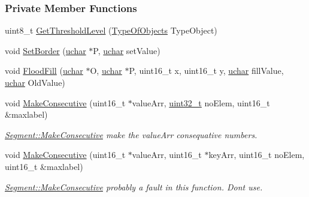 \subsubsection*{Private Member Functions}
\begin{DoxyCompactItemize}
\item 
uint8\+\_\+t \hyperlink{class_vision_1_1_segment_a1b15d616db9cbdcd0b07bb267f60895b}{Get\+Threshold\+Level} (\hyperlink{class_vision_1_1_segment_ac3ddf2c72ee6333007510b680db1e7dd}{Type\+Of\+Objects} Type\+Object)
\item 
void \hyperlink{class_vision_1_1_segment_ae3349aa3725f883943fb316c0d52752d}{Set\+Border} (\hyperlink{_soil_math_types_8h_a65f85814a8290f9797005d3b28e7e5fc}{uchar} $\ast$P, \hyperlink{_soil_math_types_8h_a65f85814a8290f9797005d3b28e7e5fc}{uchar} set\+Value)
\item 
void \hyperlink{class_vision_1_1_segment_a5d8f5daae7e5ca64c5e273464624f6bd}{Flood\+Fill} (\hyperlink{_soil_math_types_8h_a65f85814a8290f9797005d3b28e7e5fc}{uchar} $\ast$O, \hyperlink{_soil_math_types_8h_a65f85814a8290f9797005d3b28e7e5fc}{uchar} $\ast$P, uint16\+\_\+t x, uint16\+\_\+t y, \hyperlink{_soil_math_types_8h_a65f85814a8290f9797005d3b28e7e5fc}{uchar} fill\+Value, \hyperlink{_soil_math_types_8h_a65f85814a8290f9797005d3b28e7e5fc}{uchar} Old\+Value)
\item 
void \hyperlink{class_vision_1_1_segment_ad1d04c97a79dbbf1cf10e8587985e5e5}{Make\+Consecutive} (uint16\+\_\+t $\ast$value\+Arr, \hyperlink{_soil_math_types_8h_a435d1572bf3f880d55459d9805097f62}{uint32\+\_\+t} no\+Elem, uint16\+\_\+t \&maxlabel)
\begin{DoxyCompactList}\small\item\em \hyperlink{class_vision_1_1_segment_ad1d04c97a79dbbf1cf10e8587985e5e5}{Segment\+::\+Make\+Consecutive} make the value\+Arr consequative numbers. \end{DoxyCompactList}\item 
void \hyperlink{class_vision_1_1_segment_abbcd44154f3be5c7a0ee7fec67838f59}{Make\+Consecutive} (uint16\+\_\+t $\ast$value\+Arr, uint16\+\_\+t $\ast$key\+Arr, uint16\+\_\+t no\+Elem, uint16\+\_\+t \&maxlabel)
\begin{DoxyCompactList}\small\item\em \hyperlink{class_vision_1_1_segment_ad1d04c97a79dbbf1cf10e8587985e5e5}{Segment\+::\+Make\+Consecutive} probably a fault in this function. Don\textquotesingle{}t use. \end{DoxyCompactList}\item 

\end{DoxyCompactItemize}
